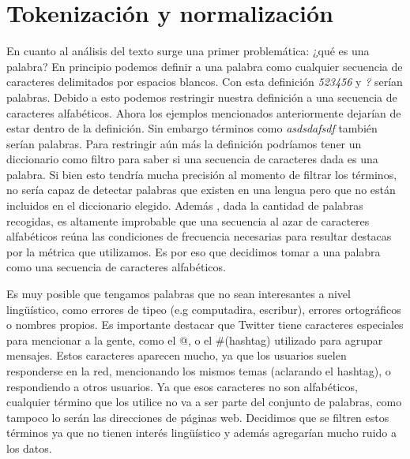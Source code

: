 

\section{Tokenización y normalización}

En cuanto al análisis del texto surge una primer problemática: ¿qué es una palabra? En principio podemos definir a una palabra como cualquier secuencia de caracteres delimitados por espacios blancos. Con esta definición \textit{523456} y \textit{?} serían palabras. Debido a esto podemos restringir nuestra definición a una secuencia de caracteres alfabéticos. Ahora los ejemplos mencionados anteriormente dejarían de estar dentro de la definición. Sin embargo términos como \textit{asdsdafsdf} también serían palabras. Para restringir aún más la definición podríamos tener un diccionario como filtro para saber si una secuencia de caracteres dada es una palabra. Si bien esto tendría mucha precisión al momento de filtrar los términos, no sería capaz de detectar palabras que existen en una lengua pero que no están incluidos en el diccionario elegido. Además , dada la cantidad de palabras recogidas, es altamente improbable que una secuencia al azar de caracteres alfabéticos reúna las condiciones de frecuencia necesarias para resultar destacas por la métrica que utilizamos. Es por eso que decidimos tomar a una palabra como una secuencia de caracteres alfabéticos.

Es muy posible que tengamos palabras que no sean interesantes a nivel lingüístico, como errores de tipeo (e.g computadira, escribur), errores ortográficos o  nombres propios. Es importante destacar que Twitter tiene caracteres especiales para mencionar a la gente, como el @, o el \#(hashtag) utilizado para agrupar mensajes. Estos caracteres aparecen mucho, ya que los usuarios suelen responderse en la red, mencionando los mismos temas (aclarando el hashtag), o respondiendo a otros usuarios. Ya que esos caracteres no son alfabéticos, cualquier término que los utilice no va a ser parte del conjunto de palabras, como tampoco lo serán las direcciones de páginas web. Decidimos que se filtren estos términos ya que no tienen interés lingüístico y además agregarían mucho ruido a los datos.

